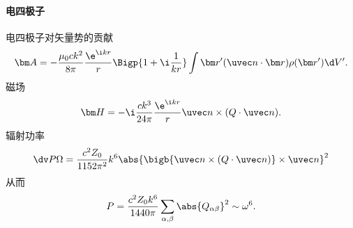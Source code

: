 \paragraph{电四极子}
电四极子对矢量势的贡献
\[
    \bm A=-\frac{\mu_0ck^2}{8\pi}\frac{\e^{\i kr}}r\Bigp{1+\i\frac1{kr}}\int\bm r'(\uvec n\cdot\bm r)\rho(\bm r')\d V'.
\]
磁场
\[
    \bm H=-\i\frac{ck^3}{24\pi}\frac{\e^{\i kr}}r\uvec n\times(Q\cdot\uvec n).
\]
辐射功率 
\[
    \dv P\Omega=\frac{c^2Z_0}{1152\pi^2}k^6\abs{\bigb{\uvec n\times(Q\cdot\uvec n)}\times\uvec n}^2
\]
从而 
\[
    P=\frac{c^2Z_0k^6}{1440\pi}\sum_{\alpha,\beta}\abs{Q_{\alpha\beta}}^2\sim\omega^6.
\]


